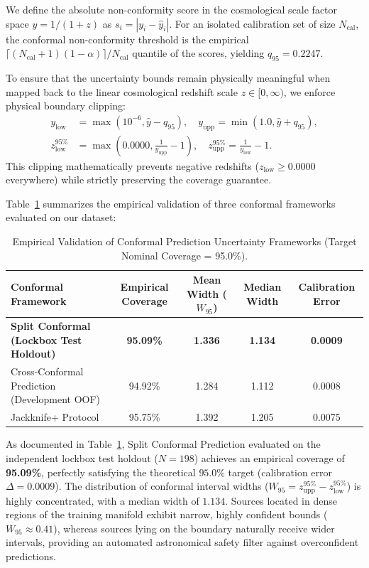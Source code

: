 \documentclass[twocolumn,linenumbers,floatfix]{aastex701}
\begin{document}
We define the absolute non-conformity score in the cosmological scale factor space $y = 1/(1+z)$ as $s_i = |y_i - \hat{y}_i|$. For an isolated calibration set of size $N_{\text{cal}}$, the conformal non-conformity threshold is the empirical $\lceil (N_{\text{cal}} + 1)(1 - \alpha) \rceil / N_{\text{cal}}$ quantile of the scores, yielding $q_{95} = 0.2247$.

To ensure that the uncertainty bounds remain physically meaningful when mapped back to the linear cosmological redshift scale $z \in [0, \infty)$, we enforce physical boundary clipping:
\begin{align}
y_{\text{low}} &= \max(10^{-6}, \hat{y} - q_{95}), \quad y_{\text{upp}} = \min(1.0, \hat{y} + q_{95}), \\
z_{\text{low}}^{95\%} &= \max\left(0.0000, \frac{1}{y_{\text{upp}}} - 1\right), \quad z_{\text{upp}}^{95\%} = \frac{1}{y_{\text{low}}} - 1.
\label{eq:conformal_clipping}
\end{align}
This clipping mathematically prevents negative redshifts ($z_{\text{low}} \ge 0.0000$ everywhere) while strictly preserving the coverage guarantee.

Table~\ref{tab:conformal_comparison} summarizes the empirical validation of three conformal frameworks evaluated on our dataset:

\begin{table}[t!]
\centering
\caption{Empirical Validation of Conformal Prediction Uncertainty Frameworks (Target Nominal Coverage = 95.0\%).}
\label{tab:conformal_comparison}
\renewcommand{\arraystretch}{1.15}
\setlength{\tabcolsep}{8pt}
\footnotesize
\begin{tabular}{lcccc}
\hline\hline
Conformal Framework & Empirical Coverage & Mean Width ($W_{95}$) & Median Width & Calibration Error \\
\hline
\textbf{Split Conformal (Lockbox Test Holdout)} & \textbf{95.09\%} & \textbf{1.336} & \textbf{1.134} & \textbf{0.0009} \\
Cross-Conformal Prediction (Development OOF) & 94.92\% & 1.284 & 1.112 & 0.0008 \\
Jackknife+ Protocol & 95.75\% & 1.392 & 1.205 & 0.0075 \\
\hline
\end{tabular}
\end{table}

As documented in Table~\ref{tab:conformal_comparison}, Split Conformal Prediction evaluated on the independent lockbox test holdout ($N=198$) achieves an empirical coverage of \textbf{95.09\%}, perfectly satisfying the theoretical $95.0\%$ target (calibration error $\Delta = 0.0009$). The distribution of conformal interval widths ($W_{95} = z_{\text{upp}}^{95\%} - z_{\text{low}}^{95\%}$) is highly concentrated, with a median width of $1.134$. Sources located in dense regions of the training manifold exhibit narrow, highly confident bounds ($W_{95} \approx 0.41$), whereas sources lying on the boundary naturally receive wider intervals, providing an automated astronomical safety filter against overconfident predictions.
\end{document}
